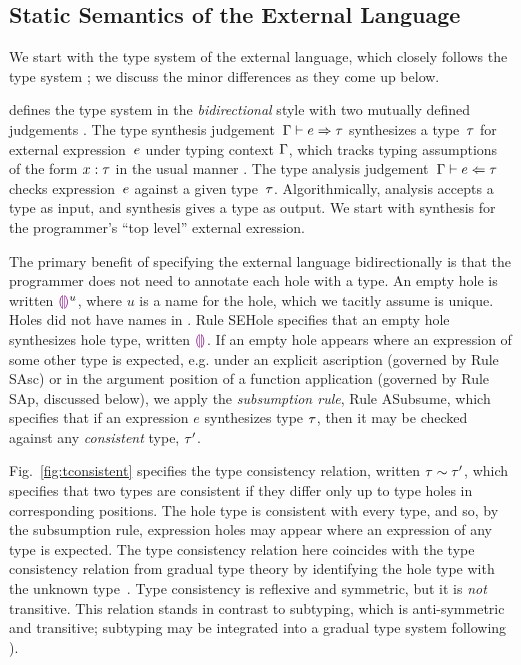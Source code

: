 \subsection{Static Semantics of the External Language}
\label{sec:external-statics}


We start with the type system of the \HazelnutLive
external language, which closely follows the \Hazelnut type
system \cite{popl-paper}; we discuss the minor differences as they come up below.

 defines the type system in the \emph{bidirectional} style 
%
with two mutually defined judgements \cite{Pierce:2000ve,bidi-tutorial,DBLP:conf/icfp/DunfieldK13,Chlipala:2005da}. The type synthesis
judgement~$\Gamma \vdash e \Rightarrow \tau$ synthesizes a type~$\tau$
for external expression~$e$ under typing context $\Gamma$, which tracks typing
assumptions of the form $x : \tau$ in the usual
manner \cite{pfpl,tapl}.
%
The type analysis judgement~$\Gamma \vdash e \Leftarrow \tau$ checks
expression~$e$ against a given type~$\tau$.
%
Algorithmically, analysis accepts a type as input, and synthesis gives
a type as output.
%
We start with synthesis for the programmer's ``top level'' external
exression.


The primary benefit of specifying the \HazelnutLive external language 
bidirectionally is that the programmer does not need to annotate each hole with a type. 
%
An empty hole is
written $\textcolor{violet}{\llparenthesis}\textcolor{violet}{\rrparenthesis}^{u}$, where $u$ is a name for the hole, which we tacitly assume is unique. 
Holes did not have names in \Hazelnut. 
%
Rule {SEHole} specifies that an empty hole synthesizes hole type, written $\textcolor{violet}{\llparenthesis}\textcolor{violet}{\rrparenthesis}$.
%
If an empty hole appears where an expression of some other type is
expected, e.g. under an explicit ascription (governed by Rule {SAsc})
or in the argument position of a function application (governed by
Rule {SAp}, discussed below), we apply the \emph{subsumption rule},
Rule {ASubsume}, which specifies that if an expression $e$ synthesizes
type $\tau$, then it may be checked against any \emph{consistent}
type, $\tau'$.



Fig.~\ref{fig:tconsistent} specifies the type consistency relation, written $\tau \sim \tau'$, which specifies that two types are consistent if they differ only up to type holes in corresponding positions.
%
The hole type is consistent with every type, and so, by the subsumption rule, expression holes may appear where an expression of any type is expected. The type consistency relation here coincides with the type consistency relation from gradual type theory by identifying the hole type with the unknown type~\cite{Siek06a}.
%
Type consistency is reflexive and symmetric, but it is \emph{not} transitive.
%
This relation stands in contrast to subtyping, which is anti-symmetric and transitive; subtyping may be integrated into a gradual type system following \citet{Siek:2007qy}).

